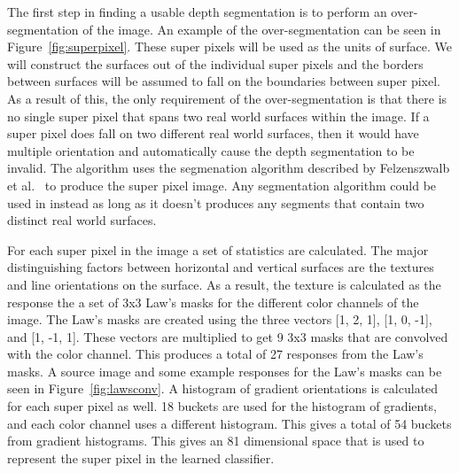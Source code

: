 \documentclass[times,10pt,twocolumn]{article}
\begin{document}
The first step in finding a usable depth segmentation is to perform an
over-segmentation of the image. An example of the over-segmentation can be seen
in Figure~\ref{fig:superpixel}. These super pixels will be used as the units
of surface. We will construct the surfaces out of the individual super pixels
and the borders between surfaces will be assumed to fall on the boundaries
between super pixel. As a result of this, the only requirement of the
over-segmentation is that there is no single super pixel that spans two real
world surfaces within the image. If a super pixel does fall on two different
real world surfaces, then it would have multiple orientation and automatically
cause the depth segmentation to be invalid. The algorithm uses the segmenation
algorithm described by Felzenszwalb et al.~\cite{Felzen} to produce the super
pixel image. Any segmentation algorithm could be used in instead as long as it
doesn't produces any segments that contain two distinct real world surfaces.

For each super pixel in the image a set of statistics are calculated. The major
distinguishing factors between horizontal and vertical surfaces are the
textures and line orientations on the surface. As a result, the texture is
calculated as the response the a set of 3x3 Law's masks for the different color
channels of the image. The Law's masks are created using the three vectors
[1, 2, 1], [1, 0, -1], and [1, -1, 1]. These vectors are multiplied to get
9 3x3 masks that are convolved with the color channel. This produces a total of
27 responses from the Law's masks. A source image and some example responses
for the Law's masks can be seen in Figure~\ref{fig:lawsconv}. A histogram of
gradient orientations is calculated for each super pixel as well. 18 buckets
are used for the histogram of gradients, and each color channel uses a
different histogram. This gives a total of 54 buckets from gradient histograms.
This gives an 81 dimensional space that is used to represent the super pixel in
the learned classifier.

\end{document}
